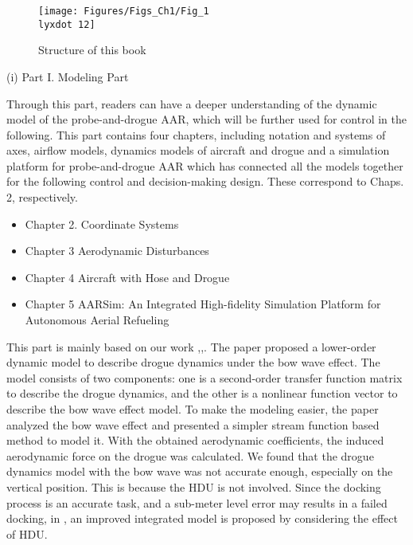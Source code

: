 \begin{figure}
\begin{centering}
\texttt{[image: Figures/Figs\_Ch1/Fig\_1\\lyxdot 12]}
\par\end{centering}
\caption{Structure of this book}

\centering{}\label{Fig_1.12}
\end{figure}

(i) Part I. Modeling Part 

Through this part, readers can have a deeper understanding of the
dynamic model of the probe-and-drogue AAR, which will be further used
for control in the following. This part contains four chapters, including
notation and systems of axes, airflow models, dynamics models of aircraft
and drogue and a simulation platform for probe-and-drogue AAR which
has connected all the models together for the following control and
decision-making design. These correspond to Chaps. 2,
respectively. 
\begin{itemize}
\item Chapter 2. Coordinate Systems 
\item Chapter 3 Aerodynamic Disturbances  
\item Chapter 4 Aircraft with Hose and Drogue
\item Chapter 5 AARSim: An Integrated High-fidelity Simulation Platform for Autonomous Aerial Refueling 
\end{itemize}
This part is mainly based on our work \cite{wei2016drogue},\cite{dai2016modeling},\cite{dai2019hose}.
The paper \cite{wei2016drogue} proposed a lower-order dynamic model
to describe drogue dynamics under the bow wave effect. The model consists
of two components: one is a second-order transfer function matrix
to describe the drogue dynamics, and the other is a nonlinear function
vector to describe the bow wave effect model. To make the modeling
easier, the paper \cite{dai2016modeling} analyzed the bow wave effect
and presented a simpler stream function based method to model it.
With the obtained aerodynamic coefficients, the induced aerodynamic
force on the drogue was calculated. We found that the drogue dynamics
model with the bow wave was not accurate enough, especially on the
vertical position. This is because the HDU is not involved. Since
the docking process is an accurate task, and a sub-meter level error
may results in a failed docking, in \cite{dai2019hose}, an improved integrated
model is proposed by considering the effect of HDU.

